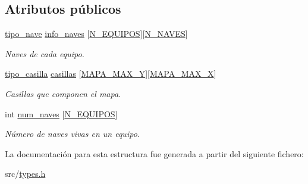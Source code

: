 \subsection*{Atributos públicos}
\begin{DoxyCompactItemize}
\item 
\mbox{\label{structtipo__mapa_a4796e19ff6b789ec44086b1bd662cd37}} 
\hyperlink{structtipo__nave}{tipo\+\_\+nave} \hyperlink{structtipo__mapa_a4796e19ff6b789ec44086b1bd662cd37}{info\+\_\+naves} \mbox{[}\hyperlink{types_8h_ab306668933fb4316ac0f5ef291d13dff}{N\+\_\+\+E\+Q\+U\+I\+P\+OS}\mbox{]}\mbox{[}\hyperlink{types_8h_aa1f2aba814c6d46772f9694849eeaa7a}{N\+\_\+\+N\+A\+V\+ES}\mbox{]}
\begin{DoxyCompactList}\small\item\em Naves de cada equipo. \end{DoxyCompactList}\item 
\mbox{\label{structtipo__mapa_a92396d1db1745ec9b6aa2e53adf8981e}} 
\hyperlink{structtipo__casilla}{tipo\+\_\+casilla} \hyperlink{structtipo__mapa_a92396d1db1745ec9b6aa2e53adf8981e}{casillas} \mbox{[}\hyperlink{types_8h_a3f33f475897a86ab01a06d506eb0d925}{M\+A\+P\+A\+\_\+\+M\+A\+X\+\_\+Y}\mbox{]}\mbox{[}\hyperlink{types_8h_aef2eccdd4c60af9c7f30ed4eb2a567b0}{M\+A\+P\+A\+\_\+\+M\+A\+X\+\_\+X}\mbox{]}
\begin{DoxyCompactList}\small\item\em Casillas que componen el mapa. \end{DoxyCompactList}\item 
\mbox{\label{structtipo__mapa_a5a59bf5262122191c18e3a94eae24a8c}} 
int \hyperlink{structtipo__mapa_a5a59bf5262122191c18e3a94eae24a8c}{num\+\_\+naves} \mbox{[}\hyperlink{types_8h_ab306668933fb4316ac0f5ef291d13dff}{N\+\_\+\+E\+Q\+U\+I\+P\+OS}\mbox{]}
\begin{DoxyCompactList}\small\item\em Número de naves vivas en un equipo. \end{DoxyCompactList}\end{DoxyCompactItemize}


La documentación para esta estructura fue generada a partir del siguiente fichero\+:\begin{DoxyCompactItemize}
\item 
src/\hyperlink{types_8h}{types.\+h}\end{DoxyCompactItemize}
